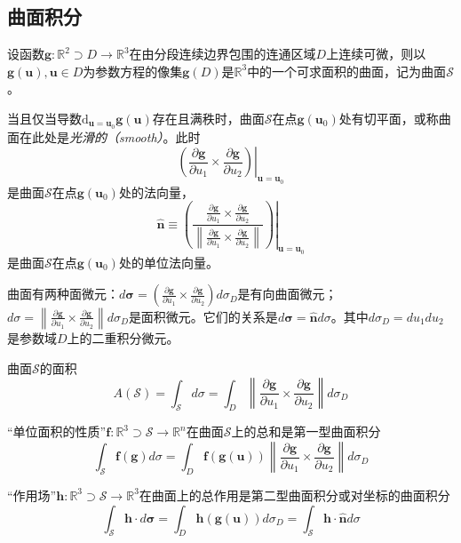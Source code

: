 \documentclass[../main.tex]{subfiles}
\begin{document}
\subsection{曲面积分}
设函数$\mathbf{g}:\mathbb{R}^2\supset D\rightarrow\mathbb{R}^3$在由分段连续边界包围的连通区域$D$上连续可微，则以$\mathbf{g}\left(\mathbf{u}\right),\mathbf{u}\in D$为参数方程的像集$\mathbf{g}\left(D\right)$是$\mathbb{R}^3$中的一个可求面积的曲面，记为曲面$\mathcal{S}$。

当且仅当导数$\mathrm{d}_{\mathbf{u}=\mathbf{u}_0}\mathbf{g}\left(\mathbf{u}\right)$存在且满秩时，曲面$\mathcal{S}$在点$\mathbf{g}\left(\mathbf{u}_0\right)$处有切平面，或称曲面在此处是\emph{光滑的（smooth）}。此时
\[
    \left.\left(\frac{\partial \mathbf{g}}{\partial u_1}\times\frac{\partial \mathbf{g}}{\partial u_2}\right)\right|_{\mathbf{u}=\mathbf{u}_0}
\]
是曲面$\mathcal{S}$在点$\mathbf{g}\left(\mathbf{u}_0\right)$处的法向量，
\[
    \mathbf{\hat{n}}\equiv\left.\left(\frac{\frac{\partial \mathbf{g}}{\partial u_1}\times\frac{\partial\mathbf{g}}{\partial u_2}}{\left\|\frac{\partial\mathbf{g}}{\partial u_1}\times\frac{\partial\mathbf{g}}{\partial u_2}\right\|}\right)\right|_{\mathbf{u}=\mathbf{u}_0}
\]
是曲面$\mathcal{S}$在点$\mathbf{g}\left(\mathbf{u}_0\right)$处的单位法向量。

曲面有两种面微元：$d\symbf{\sigma}=\left(\frac{\partial\mathbf{g}}{\partial u_1}\times\frac{\partial\mathbf{g}}{\partial u_2}\right)d\sigma_D$是有向曲面微元；$d\sigma=\left\|\frac{\partial\mathbf{g}}{\partial u_1}\times\frac{\partial\mathbf{g}}{\partial u_2}\right\|d\sigma_D$是面积微元。它们的关系是$d\symbf{\sigma}=\hat{\mathbf{n}}d\sigma$。其中$d\sigma_D=du_1du_2$是参数域$D$上的二重积分微元。

曲面$\mathcal{S}$的面积
\[
    A\left(\mathcal{S}\right)=\int_{\mathcal{S}}d\sigma=\int_D\left\|\frac{\partial\mathbf{g}}{\partial u_1}\times\frac{\partial\mathbf{g}}{\partial u_2}\right\|d\sigma_D
\]

“单位面积的性质”$\mathbf{f}:\mathbb{R}^3\supset \mathcal{S}\rightarrow\mathbb{R}^n$在曲面$\mathcal{S}$上的总和是第一型曲面积分\cite[p.~165,定理9.4.1]{华工高数2009下}
\[
    \int_{\mathcal{S}}\mathbf{f}\left(\mathbf{g}\right)d\sigma=\int_D\mathbf{f}\left(\mathbf{g}\left(\mathbf{u}\right)\right)\left\|\frac{\partial\mathbf{g}}{\partial u_1}\times\frac{\partial\mathbf{g}}{\partial u_2}\right\|d\sigma_D
\]

“作用场”$\mathbf{h}:\mathbb{R}^3\supset\mathcal{S}\rightarrow\mathbb{R}^3$在曲面上的总作用是第二型曲面积分或对坐标的曲面积分\cite[\S 9.5]{华工高数2009下}
\[
    \int_{\mathcal{S}}\mathbf{h}\cdot d\symbf{\sigma}=\int_D\mathbf{h}\left(\mathbf{g}\left(\mathbf{u}\right)\right)d\sigma_D=\int_{\mathcal{S}}\mathbf{h}\cdot\mathbf{\hat{n}}d\sigma
\]
\end{document}
